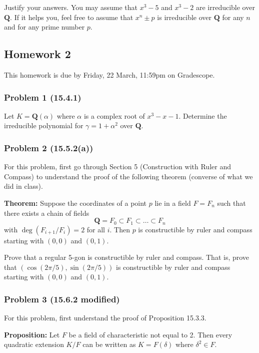 \documentclass[11pt]{article}
\begin{document}
Justify your answers.
You may assume that \(x^3-5\) and \(x^3-2\) are irreducible over \(\mathbf{Q}\).  
If it helps you, feel free to assume that \(x^n \pm p\) is irreducible over \(\mathbf{Q}\) for any \(n\) and for any prime number \(p\).
\subsection{Homework 2}
\label{sec:orga997c90}
This homework is due by Friday, 22 March, 11:59pm on Gradescope.
\subsubsection{Problem 1 (15.4.1)}
\label{sec:org892729e}

Let \(K = \mathbf{Q}(\alpha)\) where \(\alpha\) is a complex root of \(x^3-x-1\).
Determine the irreducible polynomial for \(\gamma = 1 + \alpha^2\) over \(\mathbf{Q}\).
\subsubsection{Problem 2 (15.5.2(a))}
\label{sec:org01f8b0f}

For this problem, first go through Section 5 (Construction with Ruler and Compass) to understand the proof of the following theorem (converse of what we did in class).

\bigskip

\noindent
\textbf{\textbf{Theorem:}} Suppose the coordinates of a point \(p\) lie in a field \(F = F_n\) such that there exists a chain of fields
\[ \mathbf{Q} = F_0 \subset F_1 \subset \dots \subset F_n\]
with \(\deg (F_{i+1} / F_i) = 2\) for all \(i\).
Then \(p\) is constructible by ruler and compass starting with \((0,0)\) and \((0,1)\).

\bigskip

Prove that a regular 5-gon is constructible by ruler and compass.
That is, prove that \((\cos (2\pi/5), \sin (2\pi/5))\) is constructible by ruler and compass starting with \((0,0)\) and \((0,1)\).
\subsubsection{Problem 3 (15.6.2 modified)}
\label{sec:org2cd6bc0}

For this problem, first understand the proof of Proposition 15.3.3.

\bigskip

\noindent
\textbf{\textbf{Proposition:}} Let \(F\) be a field of characteristic not equal to 2.  Then every quadratic extension \(K/F\) can be written as \(K = F(\delta)\) where \(\delta^2 \in F\).
\end{document}
